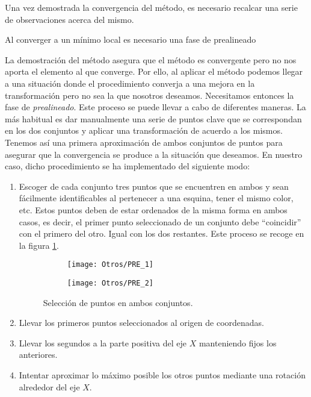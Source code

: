 \bigskip

Una vez demostrada la convergencia del método, es necesario recalcar una serie de observaciones acerca del mismo.
\bigskip

\begin{observacion}
Al converger a un mínimo local es necesario una fase de prealineado
\end{observacion}
La demostración del método asegura que el método es convergente pero no nos aporta el elemento al que converge. Por ello, al aplicar el método podemos llegar a una situación donde el procedimiento converja a una mejora en la transformación  pero no sea la que nosotros deseamos. Necesitamos entonces la fase de \textit{prealineado}. Este proceso se puede llevar a cabo de diferentes maneras. La más habitual es dar manualmente una serie de puntos clave que se correspondan en los dos conjuntos y aplicar una transformación de acuerdo a los mismos. Tenemos así una primera aproximación de ambos conjuntos de puntos para asegurar que la convergencia se produce a la situación que deseamos. En nuestro caso, dicho procedimiento se ha implementado del siguiente modo:


\begin{enumerate}
\item Escoger de cada conjunto tres puntos que se encuentren en ambos y sean fácilmente identificables al pertenecer a una esquina, tener el mismo color, etc. Estos puntos deben de estar ordenados de la misma forma en ambos casos, es decir, el primer punto seleccionado de un conjunto debe ``coincidir'' con el primero del otro. Igual con los dos restantes. Este proceso se recoge en la figura \ref{fig:ex-pre}.

\begin{figure}[h!]
		\begin{subfigure}{0.5\textwidth}
			\centering
			\texttt{[image: Otros/PRE\_1]} 
			\caption{}
		\end{subfigure}
		\begin{subfigure}{0.5\textwidth}
			\centering
			\texttt{[image: Otros/PRE\_2]}
			\caption{}
		\end{subfigure}	
		\caption{Selección de puntos en ambos conjuntos.}
		\label{fig:ex-pre}
\end{figure}
\item Llevar los primeros puntos seleccionados al origen de coordenadas.

\item Llevar los segundos a la parte positiva del eje $ X $ manteniendo fijos los anteriores.
\item Intentar aproximar lo máximo posible los otros puntos mediante una rotación alrededor del eje $ X $.
\end{enumerate}

